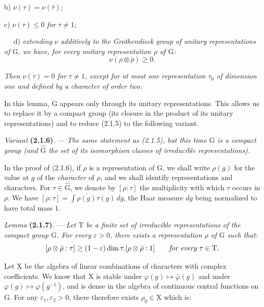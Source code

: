 \documentclass[11pt,leqno]{article}
\newcommand{\Page}[1]{\ifvmode\noindent\else\unskip\ \fi{\footnotesize\textcolor{gray}{[p.\,#1]}}\ \ignorespaces}
\begin{document}
\noindent b) \(\nu(\tau)=\nu(\bar{\tau})\);

\noindent c) \(\nu(\tau)\leq0\) \textit{for} \(\tau\neq1\);

\Page{190}
\noindent d) \textit{extending \(\nu\) additively to the Grothendieck group of unitary representations of \(\mathrm{G}\), we have, for every unitary representation \(\rho\) of \(\mathrm{G}\):}
\[
\nu(\rho\otimes\bar{\rho})\geq0.
\]

\textit{Then \(\nu(\tau)=0\) for \(\tau\neq1\), except for at most one representation \(\tau_0\) of dimension one and defined by a character of order two.}

In this lemma, \(\mathrm{G}\) appears only through its unitary representations. This allows us to replace it by a compact group (its closure in the product of its unitary representations) and to reduce (2.1.5) to the following variant.

\textit{Variant} \textbf{(2.1.6)}. — \textit{The same statement as \textup{(2.1.5)}, but this time \(\mathrm{G}\) is a compact group (and \(\widehat{\mathrm{G}}\) the set of its isomorphism classes of irreducible representations).}

In the proof of (2.1.6), if \(\rho\) is a representation of \(\mathrm{G}\), we shall write \(\rho(g)\) for the value at \(g\) of the \textit{character} of \(\rho\), and we shall identify representations and characters. For \(\tau\in\widehat{\mathrm{G}}\), we denote by \([\rho:\tau]\) the multiplicity with which \(\tau\) occurs in \(\rho\). We have \([\rho:\tau]=\int\overline{\rho(g)}\tau(g)\,dg\), the Haar measure \(dg\) being normalized to have total mass \(1\).

\textit{Lemma} \textbf{(2.1.7)}. — \textit{Let \(\mathrm{T}\) be a finite set of irreducible representations of the compact group \(\mathrm{G}\). For every \(\varepsilon>0\), there exists a representation \(\rho\) of \(\mathrm{G}\) such that:}
\[
[\rho\otimes\bar{\rho}:\tau]
 \geq(1-\varepsilon)\dim\tau.[\rho\otimes\bar{\rho}:1]
 \qquad\text{\itshape for every }\tau\in\mathrm{T}.
\]

Let \(\mathrm{X}\) be the algebra of linear combinations of characters with complex coefficients. We know that \(\mathrm{X}\) is stable under \(\varphi(g)\mapsto\bar{\varphi}(g)\) and under \(\varphi(g)\mapsto\varphi(g^{-1})\), and is dense in the algebra of continuous central functions on \(\mathrm{G}\). For any \(\varepsilon_1,\varepsilon_2>0\), there therefore exists \(\rho_0\in\mathrm{X}\) which is:
\end{document}
